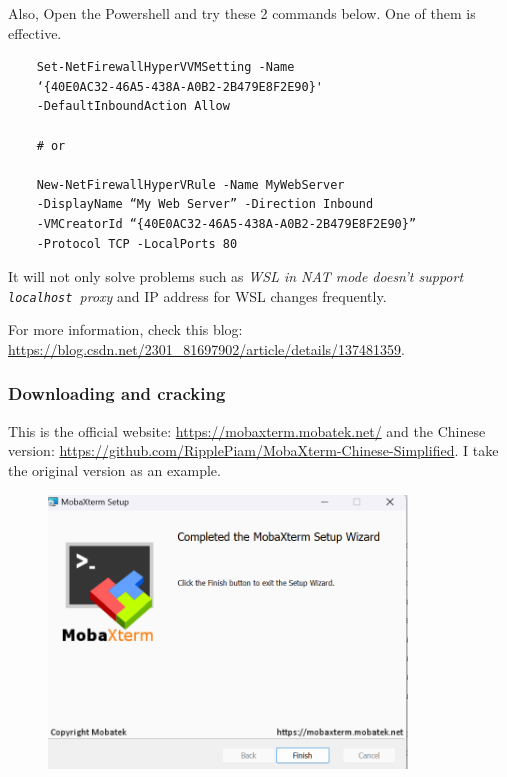 \documentclass[12pt]{ctexart}
\begin{document}
Also, Open the Powershell and try these 2 commands below. One of them is
effective.

\begin{verbatim}
    Set-NetFirewallHyperVVMSetting -Name 
    ‘{40E0AC32-46A5-438A-A0B2-2B479E8F2E90}' 
    -DefaultInboundAction Allow

    # or

    New-NetFirewallHyperVRule -Name MyWebServer 
    -DisplayName “My Web Server” -Direction Inbound 
    -VMCreatorId “{40E0AC32-46A5-438A-A0B2-2B479E8F2E90}”
    -Protocol TCP -LocalPorts 80
\end{verbatim}

It will not only solve problems such as \emph{WSL in NAT mode
doesn't support \texttt{localhost}\ proxy} and IP address
for WSL changes frequently.

For more information, check this blog:
\href{https://blog.csdn.net/2301\_81697902/article/details/137481359}{https://blog.csdn.net/2301\_81697902/article/details/137481359}.

\subsubsection{\textbf{Downloading and cracking}}

This is the official website: \href{https://mobaxterm.mobatek.net/}{https://mobaxterm.mobatek.net/} and
the Chinese version:
\url{https://github.com/RipplePiam/MobaXterm-Chinese-Simplified}. I take
the original version as an example.

\begin{figure}[H]
    \centering
    \includegraphics[width=0.85\textwidth,keepaspectratio]{assets/Linux/2.2 MobaXterm, go ssh it!/1.png}
\end{figure}
\end{document}
